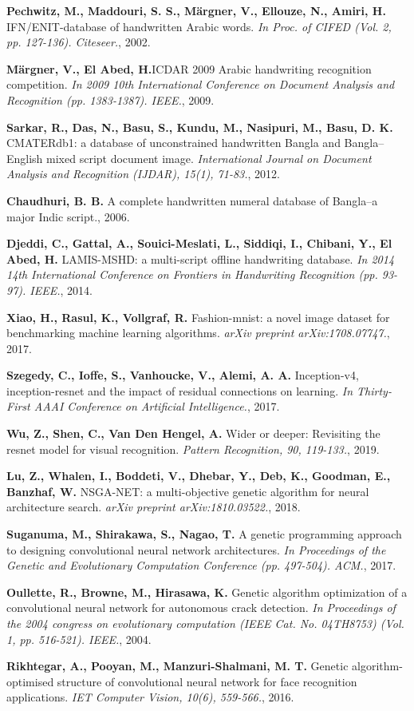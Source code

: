 \documentclass[eng]{simposium}
\begin{document}
\begin{thebibliography}{99}
\textbf{Pechwitz, M., Maddouri, S. S., Märgner, V., Ellouze, N., Amiri, H.} IFN/ENIT-database of handwritten Arabic words. \emph{In Proc. of CIFED (Vol. 2, pp. 127-136). Citeseer.}, 2002.

\textbf{Märgner, V., El Abed, H.}ICDAR 2009 Arabic handwriting recognition competition. \emph{In 2009 10th International Conference on Document Analysis and Recognition (pp. 1383-1387). IEEE.}, 2009.

\textbf{Sarkar, R., Das, N., Basu, S., Kundu, M., Nasipuri, M., Basu, D. K.} CMATERdb1: a database of unconstrained handwritten Bangla and Bangla–English mixed script document image. \emph{International Journal on Document Analysis and Recognition (IJDAR), 15(1), 71-83.}, 2012.

\textbf{Chaudhuri, B. B.} A complete handwritten numeral database of Bangla–a major Indic script., 2006.

\textbf{Djeddi, C., Gattal, A., Souici-Meslati, L., Siddiqi, I., Chibani, Y., El Abed, H.} LAMIS-MSHD: a multi-script offline handwriting database. \emph{In 2014 14th International Conference on Frontiers in Handwriting Recognition (pp. 93-97). IEEE.}, 2014.

\textbf{Xiao, H., Rasul, K., Vollgraf, R.} Fashion-mnist: a novel image dataset for benchmarking machine learning algorithms. \emph{arXiv preprint arXiv:1708.07747.}, 2017.

\textbf{Szegedy, C., Ioffe, S., Vanhoucke, V., Alemi, A. A.} Inception-v4, inception-resnet and the impact of residual connections on learning. \emph{In Thirty-First AAAI Conference on Artificial Intelligence.}, 2017.

\textbf{Wu, Z., Shen, C., Van Den Hengel, A.} Wider or deeper: Revisiting the resnet model for visual recognition. \emph{Pattern Recognition, 90, 119-133.}, 2019.

\textbf{Lu, Z., Whalen, I., Boddeti, V., Dhebar, Y., Deb, K., Goodman, E., Banzhaf, W.} NSGA-NET: a multi-objective genetic algorithm for neural architecture search. \emph{arXiv preprint arXiv:1810.03522.}, 2018.

\textbf{Suganuma, M., Shirakawa, S., Nagao, T.} A genetic programming approach to designing convolutional neural network architectures. \emph{In Proceedings of the Genetic and Evolutionary Computation Conference (pp. 497-504). ACM.}, 2017.

\textbf{Oullette, R., Browne, M., Hirasawa, K.} Genetic algorithm optimization of a convolutional neural network for autonomous crack detection. \emph{In Proceedings of the 2004 congress on evolutionary computation (IEEE Cat. No. 04TH8753) (Vol. 1, pp. 516-521). IEEE.}, 2004.

\textbf{Rikhtegar, A., Pooyan, M., Manzuri-Shalmani, M. T.} Genetic algorithm-optimised structure of convolutional neural network for face recognition applications. \emph{IET Computer Vision, 10(6), 559-566.}, 2016.

\end{thebibliography}
\end{document}
